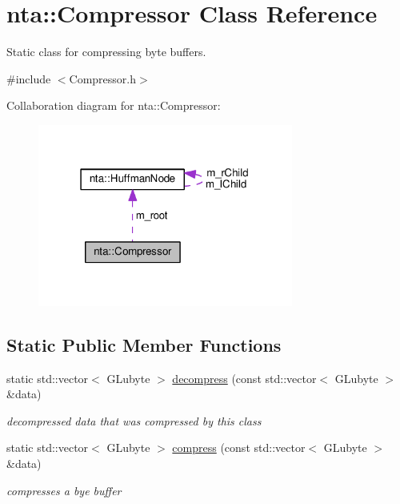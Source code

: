 \hypertarget{classnta_1_1Compressor}{}\section{nta\+:\+:Compressor Class Reference}
\label{classnta_1_1Compressor}


Static class for compressing byte buffers.  




{\ttfamily \#include $<$Compressor.\+h$>$}



Collaboration diagram for nta\+:\+:Compressor\+:\nopagebreak
\begin{figure}[H]
\begin{center}
\leavevmode
\includegraphics[width=238pt]{d6/deb/classnta_1_1Compressor__coll__graph}
\end{center}
\end{figure}
\subsection*{Static Public Member Functions}
\begin{DoxyCompactItemize}
\item 
\mbox{\label{classnta_1_1Compressor_aaf2c8b87946d2cee8b4edcf4c48f7f71}} 
static std\+::vector$<$ G\+Lubyte $>$ \hyperlink{classnta_1_1Compressor_aaf2c8b87946d2cee8b4edcf4c48f7f71}{decompress} (const std\+::vector$<$ G\+Lubyte $>$ \&data)
\begin{DoxyCompactList}\small\item\em decompressed data that was compressed by this class \end{DoxyCompactList}\item 
\mbox{\label{classnta_1_1Compressor_ac5f5822b598309d4ef6a89edb7bdcf10}} 
static std\+::vector$<$ G\+Lubyte $>$ \hyperlink{classnta_1_1Compressor_ac5f5822b598309d4ef6a89edb7bdcf10}{compress} (const std\+::vector$<$ G\+Lubyte $>$ \&data)
\begin{DoxyCompactList}\small\item\em compresses a bye buffer \end{DoxyCompactList}\end{DoxyCompactItemize}
